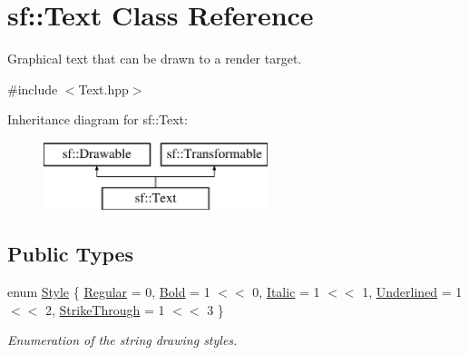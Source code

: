 \hypertarget{classsf_1_1_text}{}\section{sf\+:\+:Text Class Reference}
\label{classsf_1_1_text}


Graphical text that can be drawn to a render target.  




{\ttfamily \#include $<$Text.\+hpp$>$}

Inheritance diagram for sf\+:\+:Text\+:\begin{figure}[H]
\begin{center}
\leavevmode
\includegraphics[height=2.000000cm]{classsf_1_1_text}
\end{center}
\end{figure}
\subsection*{Public Types}
\begin{DoxyCompactItemize}
\item 
enum \hyperlink{classsf_1_1_text_aa8add4aef484c6e6b20faff07452bd82}{Style} \{ \newline
\hyperlink{classsf_1_1_text_aa8add4aef484c6e6b20faff07452bd82a2af9ae5e1cda126570f744448e0caa32}{Regular} = 0, 
\hyperlink{classsf_1_1_text_aa8add4aef484c6e6b20faff07452bd82af1b47f98fb1e10509ba930a596987171}{Bold} = 1 $<$$<$ 0, 
\hyperlink{classsf_1_1_text_aa8add4aef484c6e6b20faff07452bd82aee249eb803848723c542c2062ebe69d8}{Italic} = 1 $<$$<$ 1, 
\hyperlink{classsf_1_1_text_aa8add4aef484c6e6b20faff07452bd82a664bd143f92b6e8c709d7f788e8b20df}{Underlined} = 1 $<$$<$ 2, 
\newline
\hyperlink{classsf_1_1_text_aa8add4aef484c6e6b20faff07452bd82a9ed1f5bb154c21269e1190c5aa97d479}{Strike\+Through} = 1 $<$$<$ 3
 \}\begin{DoxyCompactList}\small\item\em Enumeration of the string drawing styles. \end{DoxyCompactList}
\end{DoxyCompactItemize}
